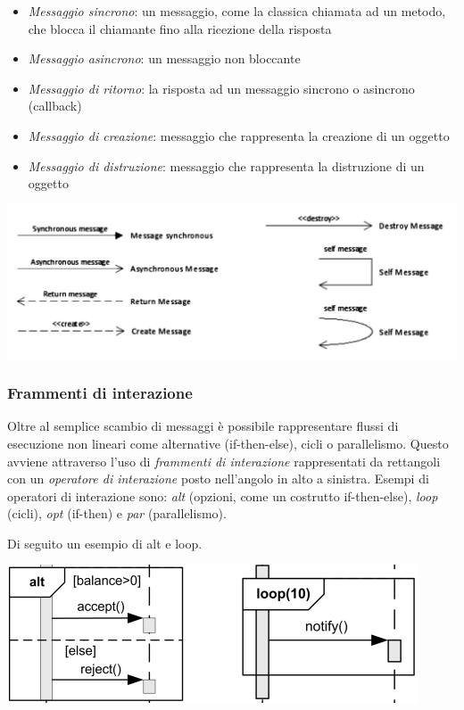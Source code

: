 \documentclass{article}
\begin{document}
\begin{itemize}
\item  \textit{Messaggio sincrono}: un messaggio, come la classica chiamata ad un metodo, che blocca il chiamante fino alla ricezione della risposta 
\item  \textit{Messaggio asincrono}: un messaggio non bloccante
\item  \textit{Messaggio di ritorno}: la risposta ad un messaggio sincrono o asincrono (callback)
\item  \textit{Messaggio di creazione}: messaggio che rappresenta la creazione di un oggetto
\item  \textit{Messaggio di distruzione}: messaggio che rappresenta la distruzione di un oggetto 
\end{itemize}


\begin{center}
\includegraphics[scale=0.5]{seq-not.png}\\
\end{center}


\subsubsection{Frammenti di interazione}

Oltre al semplice scambio di messaggi \`e possibile rappresentare flussi di esecuzione non lineari come alternative (if-then-else), cicli o parallelismo. Questo avviene attraverso l'uso di \textit{frammenti di interazione} rappresentati da rettangoli con un \textit{operatore di interazione} posto nell'angolo in alto a sinistra. Esempi di operatori di interazione sono:  \textit{alt} (opzioni, come un costrutto if-then-else),  \textit{loop} (cicli),  \textit{opt} (if-then) e  \textit{par} (parallelismo). 

Di seguito un esempio di alt e loop.
\vspace{0.5cm}

\begin{center}
\includegraphics[scale=4.0]{seq-frag.png}\\
\end{center}
\newpage
\end{document}
